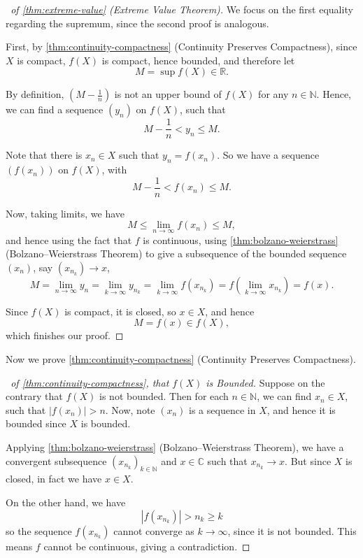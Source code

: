 \documentclass[11pt]{article}
\numberwithin{equation}{section}
\theoremstyle{definition}
\theoremstyle{remark}
\newcommand{\pqty}[1]{\left(#1\right)}
\newcommand{\abs}[1]{\left|#1\right|}
\newcommand{\RR}{\mathbb R}
\newcommand{\CC}{\mathbb C}
\newcommand{\NN}{\mathbb N}
\begin{document}
\begin{proof}[\proofname\ of \autoref{thm:extreme-value} (Extreme Value Theorem)]
    We focus on the first equality regarding the supremum, since the second proof is analogous.

    First, by \autoref{thm:continuity-compactness} (Continuity Preserves Compactness), since \(X\) is compact, \(f\pqty{X}\) is compact, hence bounded, and therefore let
    \[
        M = \sup f\pqty{X} \in \RR.
    \]

    By definition, \(\pqty{M - \frac{1}{n}}\) is not an upper bound of \(f\pqty{X}\) for any \(n \in \NN\). Hence, we can find a sequence \(\pqty{y_n}\) on \(f\pqty{X}\), such that
    \[
        M - \frac{1}{n} < y_n \leq M.
    \]

    Note that there is \(x_n \in X\) such that \(y_n = f\pqty{x_n}\). So we have a sequence \(\pqty{f\pqty{x_n}}\) on \(f\pqty{X}\), with
    \[
        M - \frac{1}{n} < f\pqty{x_n} \leq M.
    \]

    Now, taking limits, we have
    \[
        M \leq \lim_{n \to \infty} f\pqty{x_n} \leq M,
    \]
    and hence using the fact that \(f\) is continuous, using \autoref{thm:bolzano-weierstrass} (Bolzano--Weierstrass Theorem) to give a subsequence of the bounded sequence \(\pqty{x_n}\), say \(\pqty{x_{n_k}} \to x\),
    \[
        M = \lim_{n \to \infty} y_n = \lim_{k \to \infty} y_{n_k} = \lim_{k \to \infty} f\pqty{x_{n_k}} = f\pqty{\lim_{k \to \infty} x_{n_k}} = f\pqty{x}.
    \]

    Since \(f\pqty{X}\) is compact, it is closed, so \(x \in X\), and hence
    \[
        M = f\pqty{x} \in f\pqty{X},
    \]
    which finishes our proof.
\end{proof}

Now we prove \autoref{thm:continuity-compactness} (Continuity Preserves Compactness).

\begin{proof}[\proofname\ of \autoref{thm:continuity-compactness}, that \(f\pqty{X}\) is Bounded]
    Suppose on the contrary that \(f\pqty{X}\) is not bounded. Then for each \(n \in \NN\), we can find \(x_n \in X\), such that \(\abs{f\pqty{x_n}} > n\). Now, note \(\pqty{x_n}\) is a sequence in \(X\), and hence it is bounded since \(X\) is bounded.
    
    Applying \autoref{thm:bolzano-weierstrass} (Bolzano--Weierstrass Theorem), we have a convergent subsequence \(\pqty{x_{n_k}}_{k \in \NN}\) and \(x \in \CC\) such that \(x_{n_k} \to x\). But since \(X\) is closed, in fact we have \(x \in X\).
    
    On the other hand, we have
    \[
        \abs{f\pqty{x_{n_k}}} > n_k \geq k
    \]
    so the sequence \(f\pqty{x_{n_k}}\) cannot converge as \(k \to \infty\), since it is not bounded. This means \(f\) cannot be continuous, giving a contradiction.
\end{proof}
\end{document}
